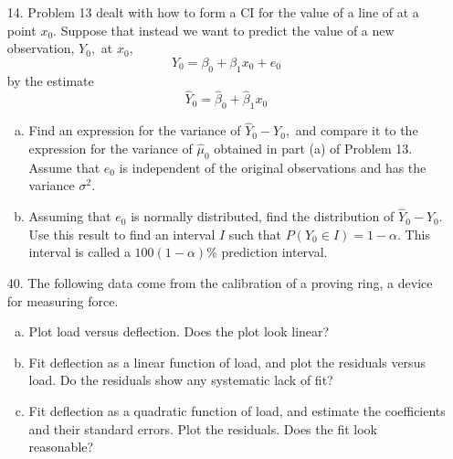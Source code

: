 \documentclass{article}
\begin{document}
\begin{itemize}
	\item[14.] Problem 13 dealt with how to form a CI for the value of a line of at a point $x_0.$ Suppose that instead we want to predict the value of a new observation, $Y_0,$ at $x_0,$ \[Y_0=\beta_0+\beta_1x_0+e_0\] by the estimate \[\hat Y_0=\hat\beta_0+\hat\beta_1x_0\]
		\begin{enumerate}[a.]
			\item Find an expression for the variance of $\hat Y_0-Y_0,$ and compare it to the expression for the variance of $\hat\mu_0$ obtained in part (a) of Problem 13. Assume that $e_0$ is independent of the original observations and has the variance $\sigma^2.$

			\item Assuming that $e_0$ is normally distributed, find the distribution of $\hat Y_0-Y_0.$ Use this result to find an interval $I$ such that $P(Y_0\in I)=1-\alpha.$ This interval is called a $100(1-\alpha)\%$ prediction interval.
				
		\end{enumerate}
		
	\item[40.] The following data come from the calibration of a proving ring, a device for measuring force.
		\begin{enumerate}[a.]
			\item Plot load versus deflection. Does the plot look linear?

			\item Fit deflection as a linear function of load, and plot the residuals versus load. Do the residuals show any systematic lack of fit?

			\item Fit deflection as a quadratic function of load, and estimate the coefficients and their standard errors. Plot the residuals. Does the fit look reasonable?
				
		\end{enumerate}

\end{itemize}
\end{document}
